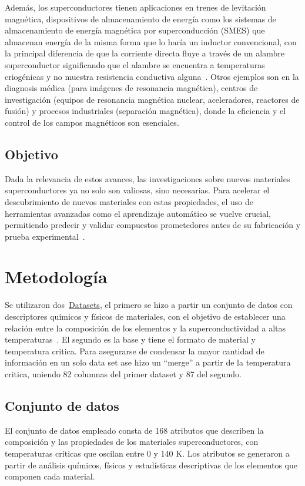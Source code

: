 \documentclass[conference]{IEEEtran} %
\begin{document}
Además, los superconductores tienen aplicaciones en trenes de levitación magnética, 
dispositivos de almacenamiento de energía como los sistemas de almacenamiento de energía magnética por
superconducción (SMES) que almacenan energía de la misma forma que
lo haría un inductor convencional, con la principal diferencia de que
la corriente directa fluye a través de un alambre superconductor significando
que el alambre se encuentra a temperaturas criogénicas
y no muestra resistencia conductiva alguna~\cite{gonzalez2013almacenamiento}. Otros ejemplos son en la 
diagnosis médica (para imágenes de resonancia magnética), centros de
investigación (equipos de resonancia magnética nuclear, aceleradores, reactores de fusión) y
procesos industriales (separación magnética), donde la eficiencia y el control de los 
campos magnéticos son esenciales.

\subsection{Objetivo}
Dada la relevancia de estos avances, las investigaciones sobre nuevos materiales 
superconductores ya no solo son valiosas, sino necesarias. Para acelerar el 
descubrimiento de nuevos materiales con estas propiedades, el uso de herramientas 
avanzadas como el aprendizaje automático se vuelve crucial, permitiendo predecir 
y validar compuestos prometedores antes de su fabricación y prueba experimental~\cite{coll2017superconductividad}.

\section{Metodología}
Se utilizaron dos~\href{https://www.kaggle.com/datasets/tunguz/superconductivty-data-data-set/code}{Datasets}, 
el primero se hizo a partir un conjunto de datos con descriptores químicos y 
físicos de materiales, con el objetivo de establecer una relación entre la 
composición de los elementos y la superconductividad a altas 
temperaturas~\cite{tunguz_superconductivity_dataset}. El segundo es la base y tiene el formato de material y temperatura critica.
Para asegurarse de condensar la mayor cantidad de información en un solo data set ase hizo 
un ``merge'' a partir de la temperatura critica, uniendo 82 columnas
del primer dataset y 87 del segundo.
 
\subsection{Conjunto de datos}
El conjunto de datos empleado consta de 168 atributos que describen la 
composición y las propiedades de los materiales superconductores, con 
temperaturas críticas que oscilan entre 0 y 140 K. Los atributos se 
generaron a partir de análisis químicos, físicos y estadísticas 
descriptivas de los elementos que componen cada material.
\end{document}
